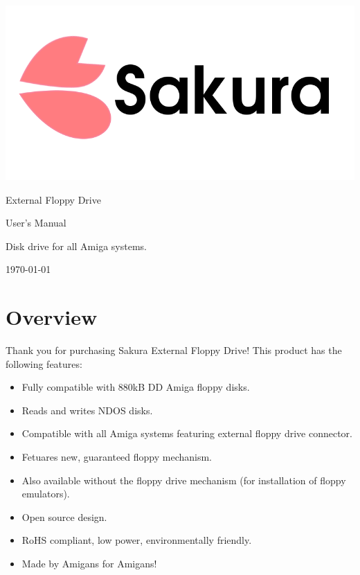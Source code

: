 \documentclass[10pt,a4paper]{article}
\begin{document}
\begin{titlepage}
\begin{center}

\includegraphics[scale=0.25]{../../common/sakuralogo.png}
\vfill

\huge
External Floppy Drive

User's Manual

\vspace*{1cm}

\normalsize
Disk drive for all Amiga systems.

\vspace*{5cm}

\today

\end{center}
\end{titlepage}

\section*{Overview}

Thank you for purchasing Sakura External Floppy Drive! This product has the following features:

\begin{itemize}
	\item Fully compatible with 880kB DD Amiga floppy disks.
	\item Reads and writes NDOS disks.
	\item Compatible with all Amiga systems featuring external floppy drive connector.
	\item Fetuares new, guaranteed floppy mechanism.
	\item Also available without the floppy drive mechanism (for installation of floppy emulators).
	\item Open source design.
	\item RoHS compliant, low power, environmentally friendly.
	\item Made by Amigans for Amigans! 
\end{itemize}
\end{document}
